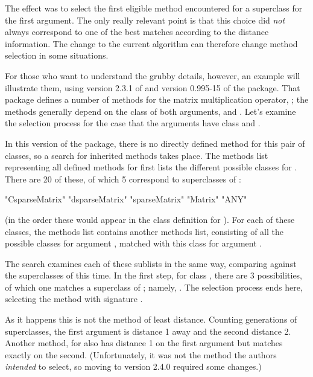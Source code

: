 \documentclass[11pt]{article}
\begin{document}
The effect was to select the first eligible method encountered for a superclass for the first argument.
The only really relevant point is that this choice did \emph{not}  always correspond to one of the best matches according to the distance information.
The change to the current algorithm can therefore change method selection in some situations.

For those who want to understand the grubby details, however, an example will illustrate them, using version 2.3.1 of \R{} and version 0.995-15 of the  package.
That package defines a number of methods for the matrix multiplication operator, \SOperator{\%*\%}; the methods generally depend on the class of both arguments,  and .
Let's examine the selection process for the case that the arguments have class  and .

In this version of the package, there is no directly defined method for this pair of classes, so a search for inherited methods takes place.
The methods list representing all defined methods for \SOperator{\%*\%} first lists the different possible classes for .
There are 20 of these, of which 5 correspond to superclasses of :
\begin{Example}
[1] "CsparseMatrix" "dsparseMatrix" "sparseMatrix"  "Matrix" "ANY"
\end{Example}
(in the order these would appear in the class definition for ).
For each of these classes, the methods list contains another methods list, consisting of all the possible classes for argument , matched with this class for argument .

The search examines each of these sublists in the same way, comparing against the superclasses of  this time.
In the first step, for class , there are 3 possibilities, of which one matches a superclass of ; namely, .
The selection process ends here, selecting the method with signature .

As it happens this is not the method of least distance.
Counting generations of superclasses, the first argument is distance 1 away and the second distance 2.
Another method, for  also has distance 1 on the first argument but matches exactly on the second.
(Unfortunately, it was not the method the authors \emph{intended}  to select, so moving to version 2.4.0 required some changes.)
\end{document}
